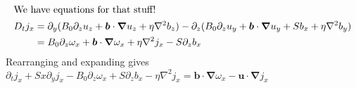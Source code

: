 \documentclass{article}
\renewcommand{\vec}[1]{\boldsymbol{#1}}
\newcommand{\grad}{\vec{\nabla}}
\newcommand{\laplacian}{\nabla^2}
\begin{document}
\begin{align*}
    \intertext{We have equations for that stuff!}
    D_t j_x &= \partial_y (B_0\partial_z u_z + \vec{b} \cdot \grad u_z + \eta\laplacian b_z) - \partial_z (B_0\partial_z u_y + \vec{b} \cdot \grad u_y + S b_x + \eta\laplacian b_y) \\
    &= B_0 \partial_z \omega_x + \vec{b} \cdot \grad \omega_x + \eta\laplacian j_x - S\partial_z b_x
\end{align*}
Rearranging and expanding gives\\

$\partial_t j_x + Sx\partial_y j_x - B_0 \partial_z \omega_x + S\partial_z b_x - \eta\laplacian j_x = \vec{b} \cdot \grad \omega_x - \vec{u} \cdot \grad j_x$
\end{document}
